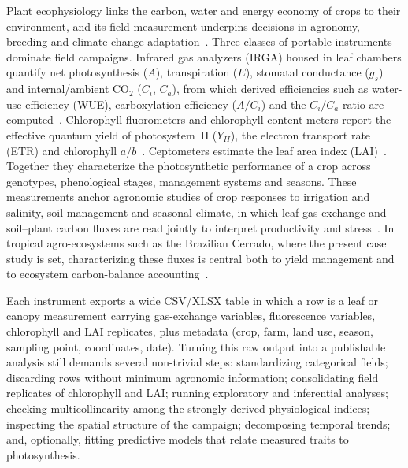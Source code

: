 \documentclass[preprint,12pt,a4paper]{elsarticle}
\begin{document}
Plant ecophysiology links the carbon, water and energy economy of crops to their environment, and its field measurement underpins decisions in agronomy, breeding and climate-change adaptation~\cite{Lambers2008,Long2006}. Three classes of portable instruments dominate field campaigns. Infrared gas analyzers (IRGA) housed in leaf chambers quantify net photosynthesis ($A$), transpiration ($E$), stomatal conductance ($g_s$) and internal/ambient CO$_2$ ($C_i$, $C_a$), from which derived efficiencies such as water-use efficiency (WUE), carboxylation efficiency ($A/C_i$) and the $C_i/C_a$ ratio are computed~\cite{Farquhar1980,vonCaemmerer2000,Long2003}. Chlorophyll fluorometers and chlorophyll-content meters report the effective quantum yield of photosystem~II ($Y_{II}$), the electron transport rate (ETR) and chlorophyll $a$/$b$~\cite{Maxwell2000,Baker2008}. Ceptometers estimate the leaf area index (LAI)~\cite{Breda2003}. Together they characterize the photosynthetic performance of a crop across genotypes, phenological stages, management systems and seasons. These measurements anchor agronomic studies of crop responses to irrigation and salinity, soil management and seasonal climate, in which leaf gas exchange and soil--plant carbon fluxes are read jointly to interpret productivity and stress~\cite{Oliveira2017,Munjonji2021,Peters2012,Sanchez2003,Guarrera2024}. In tropical agro-ecosystems such as the Brazilian Cerrado, where the present case study is set, characterizing these fluxes is central both to yield management and to ecosystem carbon-balance accounting~\cite{Vourlitis2022}.

Each instrument exports a wide CSV/XLSX table in which a row is a leaf or canopy measurement carrying gas-exchange variables, fluorescence variables, chlorophyll and LAI replicates, plus metadata (crop, farm, land use, season, sampling point, coordinates, date). Turning this raw output into a publishable analysis still demands several non-trivial steps: standardizing categorical fields; discarding rows without minimum agronomic information; consolidating field replicates of chlorophyll and LAI; running exploratory and inferential analyses; checking multicollinearity among the strongly derived physiological indices; inspecting the spatial structure of the campaign; decomposing temporal trends; and, optionally, fitting predictive models that relate measured traits to photosynthesis.
\end{document}
